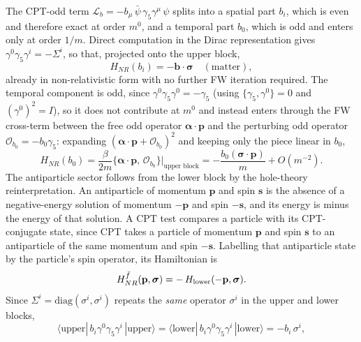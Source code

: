 The CPT-odd term $\mathcal{L}_b = -b_\mu\,\bar\psi\,\gamma_5\gamma^\mu\,\psi$
splits into a spatial part $b_i$, which is even and therefore exact at
order $m^0$, and a temporal part $b_0$, which is odd and enters only at
order $1/m$. Direct computation in the Dirac representation gives
$\gamma^0\gamma_5\gamma^i=-\Sigma^i$, so that, projected onto the upper
block,
\begin{equation}
  H_{NR}(b_i) = -\mathbf b\cdot\boldsymbol\sigma \quad (\text{matter}),
  \label{eq:HNR-bi-matter}
\end{equation}
already in non-relativistic form with no further FW iteration required.
The temporal component is odd, since $\gamma^0\gamma_5\gamma^0=-\gamma_5$
(using $\{\gamma_5,\gamma^0\}=0$ and $(\gamma^0)^2=I$), so it does not
contribute at $m^0$ and instead enters through the FW cross-term between
the free odd operator $\boldsymbol\alpha\cdot\mathbf p$ and the
perturbing odd operator $\mathcal O_{b_0}=-b_0\gamma_5$: expanding
$(\boldsymbol\alpha\cdot\mathbf p+\mathcal O_{b_0})^2$ and keeping only
the piece linear in $b_0$,
\begin{equation}
  H_{NR}(b_0) = \frac{\beta}{2m}\{\boldsymbol\alpha\cdot\mathbf p,\,\mathcal O_{b_0}\}
  \Big|_{\text{upper block}}
  = -\frac{b_0(\boldsymbol\sigma\cdot\mathbf p)}{m} + O(m^{-2}).
\end{equation}
The antiparticle sector follows from the lower block by the hole-theory
reinterpretation. An antiparticle of momentum $\mathbf p$ and spin
$\mathbf s$ is the absence of a negative-energy solution of momentum
$-\mathbf p$ and spin $-\mathbf s$, and its energy is minus the energy of
that solution. A CPT test compares a particle with its CPT-conjugate
state, since CPT takes a particle of momentum $\mathbf p$ and spin
$\mathbf s$ to an antiparticle of the same momentum and spin $-\mathbf s$.
Labelling that antiparticle state by the particle's spin operator, its
Hamiltonian is
\begin{equation}
  H_{NR}^{\bar f}(\mathbf p,\boldsymbol\sigma)
  = -\,H_{\rm lower}(-\mathbf p,\boldsymbol\sigma).
  \label{eq:HNR-anti-rule}
\end{equation}
Since $\Sigma^i=\mathrm{diag}(\sigma^i,\sigma^i)$ repeats the \emph{same}
operator $\sigma^i$ in the upper and lower blocks,
\begin{equation}
  \langle\text{upper}|\,b_i\gamma^0\gamma_5\gamma^i\,|\text{upper}\rangle =
  \langle\text{lower}|\,b_i\gamma^0\gamma_5\gamma^i\,|\text{lower}\rangle =
  -b_i\,\sigma^i,
  \label{eq:HNR-bi-block}
\end{equation}
